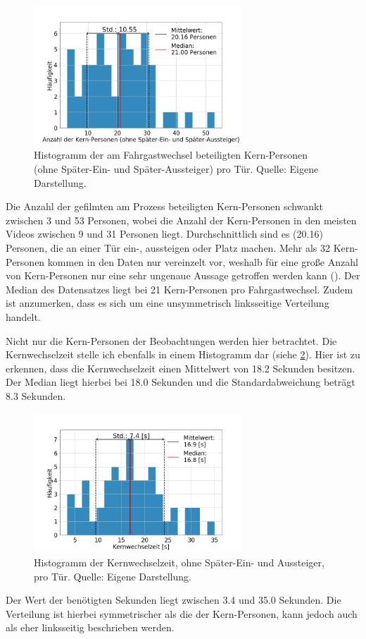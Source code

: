 \begin{figure}[H]
	\centering
		\includegraphics[width=0.7\textwidth]{pictures/data_evaluation/transferTime/hist_core_persons.png}
	\caption{Histogramm der am Fahrgastwechsel beteiligten Kern-Personen (ohne Später-Ein- und Später-Aussteiger) pro Tür. Quelle: Eigene Darstellung.}
	\label{fig:histPersonen}
\end{figure}
Die Anzahl der gefilmten am Prozess beteiligten Kern-Personen schwankt zwischen 3 und 53 Personen, wobei die Anzahl der Kern-Personen in den meisten Videos zwischen 9 und 31 Personen liegt. Durchschnittlich sind es  (20.16) Personen, die an einer Tür ein-, aussteigen oder Platz machen. Mehr als 32 Kern-Personen kommen in den Daten nur vereinzelt vor, weshalb für eine große Anzahl von Kern-Personen nur eine sehr ungenaue Aussage getroffen werden kann (\cite{Fahrmeir.2009}). Der Median des Datensatzes liegt bei 21 Kern-Personen pro Fahrgastwechsel. Zudem ist anzumerken, dass es sich um eine unsymmetrisch linksseitige Verteilung handelt.

Nicht nur die Kern-Personen der Beobachtungen werden hier betrachtet. Die Kernwechselzeit stelle ich ebenfalls in einem Histogramm dar (siehe \figurename \ref{fig:histTimes}). Hier ist zu erkennen, dass die Kernwechselzeit einen Mittelwert von 18.2 Sekunden besitzen. Der Median liegt hierbei bei 18.0 Sekunden und die Standardabweichung beträgt 8.3 Sekunden. 
\begin{figure}[H]
	\centering
		\includegraphics[width=0.7\textwidth]{pictures/data_evaluation/transferTime/hist_core_transfer_time.png}
	\caption{Histogramm der Kernwechselzeit, ohne Später-Ein- und Aussteiger, pro Tür. Quelle: Eigene Darstellung.}
	\label{fig:histTimes}
\end{figure}
Der Wert der benötigten Sekunden liegt zwischen 3.4 und 35.0 Sekunden. Die Verteilung ist hierbei symmetrischer als die der Kern-Personen, kann jedoch auch als eher linksseitig beschrieben werden.

